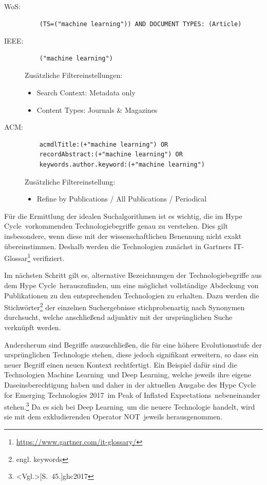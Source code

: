 \begin{description}
	\item [WoS:] \begin{verbatim}
	(TS=("machine learning")) AND DOCUMENT TYPES: (Article)
	\end{verbatim}

	\item [IEEE:] \begin{verbatim}
	("machine learning")
	\end{verbatim}
	Zusätzliche Filtereinstellungen:
	\begin{itemize}
		\item Search Context: Metadata only
		\item Content Types: Journals \& Magazines
	\end{itemize}

	\item [ACM:] \begin{verbatim}
	acmdlTitle:(+"machine learning") OR
	recordAbstract:(+"machine learning") OR
	keywords.author.keyword:(+"machine learning")
	\end{verbatim}
	Zusätzliche Filtereinstellung:
	\begin{itemize}
		\item Refine by Publications / All Publications / Periodical
	\end{itemize}
\end{description}

Für die Ermittlung der idealen Suchalgorithmen ist es wichtig, die im \glqq Hype Cycle\grqq~vorkommenden Technologiebegriffe genau zu verstehen. Dies gilt insbesondere, wenn diese mit der wissenschaftlichen Benennung nicht exakt übereinstimmen. Deshalb werden die Technologien zunächst in Gartners IT-Glossar\footnote{\url{https://www.gartner.com/it-glossary/}} verifiziert.

Im nächsten Schritt gilt es, alternative Bezeichnungen der Technologiebegriffe aus dem \glqq Hype Cycle\grqq~herauszufinden, um eine möglichst vollständige Abdeckung von Publikationen zu den entsprechenden Technologien zu erhalten. Dazu werden die Stichwörter\footnote{engl. keywords} der einzelnen Suchergebnisse stichprobenartig nach Synonymen durchsucht, welche anschließend adjunktiv mit der ursprünglichen Suche verknüpft werden.

Andersherum sind Begriffe auszuschließen, die für eine höhere Evolutionsstufe der ursprünglichen Technologie stehen, diese jedoch signifikant erweitern, so dass ein neuer Begriff einen neuen Kontext rechtfertigt. Ein Beispiel dafür sind die Technologien \glqq Machine Learning\grqq~und \glqq Deep Learning\grqq, welche jeweils ihre eigene Daseinsberechtigung haben und daher in der aktuellen Ausgabe des \glqq Hype Cycle for Emerging Technologies 2017\grqq~im \glqq Peak of Inflated Expectations\grqq~nebeneinander stehen.\footnote{\citeNP<Vgl.>[S.~45.]{ghc2017}} Da es sich bei \glqq Deep Learning\grqq~um die neuere Technologie handelt, wird sie mit dem exkludierenden Operator \glqq NOT\grqq~jeweils herausgenommen.

